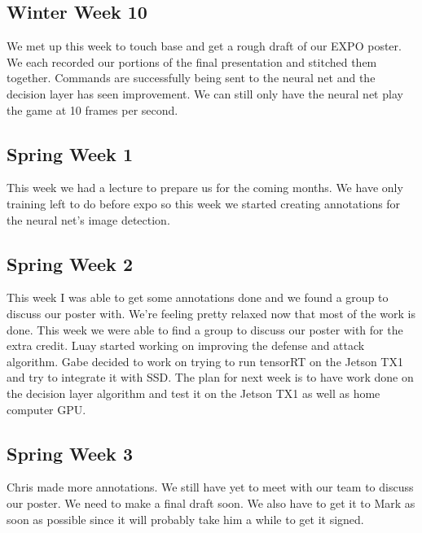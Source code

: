 \documentclass[onecolumn, draftclsnofoot,10pt, compsoc]{IEEEtran}
\begin{document}
\subsection{Winter Week 10}
We met up this week to touch base and get a rough draft of our EXPO poster.
We each recorded our portions of the final presentation and stitched them together.
Commands are successfully being sent to the neural net and the decision layer has seen improvement.
We can still only have the neural net play the game at 10 frames per second.

\subsection{Spring Week 1}
This week we had a lecture to prepare us for the coming months.
We have only training left to do before expo so this week we started creating annotations for the neural net's image detection.

\subsection{Spring Week 2}
This week I was able to get some annotations done and we found a group to discuss our poster with.
We're feeling pretty relaxed now that most of the work is done.
This week we were able to find a group to discuss our poster with for the extra credit.
Luay started working on improving the defense and attack algorithm.
Gabe decided to work on trying to run tensorRT on the Jetson TX1 and try to integrate it with SSD.
The plan for next week is to have work done on the decision layer algorithm and test it on the Jetson TX1 as well as home computer GPU.

\subsection{Spring Week 3}
Chris made more annotations.
We still have yet to meet with our team to discuss our poster.
We need to make a final draft soon.
We also have to get it to Mark as soon as possible since it will probably take him a while to get it signed.
\end{document}
